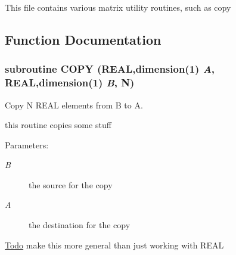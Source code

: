 This file contains various matrix utility routines, such as copy 

\subsection{Function Documentation}
\hypertarget{mat1_8F_1a5a579737d4fee8077fac949517f1d3}{
\subsubsection[COPY]{\setlength{\rightskip}{0pt plus 5cm}subroutine COPY (REAL,dimension(1) {\em A}, \/  REAL,dimension(1) {\em B}, \/  N)}}
\label{mat1_8F_1a5a579737d4fee8077fac949517f1d3}


Copy N REAL elements from B to A. 

this routine copies some stuff

\begin{Desc}
\item[Parameters:]
\begin{description}
\item[{\em B}]the source for the copy \item[{\em A}]the destination for the copy \end{description}
\end{Desc}
\begin{Desc}
\item[\hyperlink{todo__todo000002}{Todo}]make this more general than just working with REAL \end{Desc}
